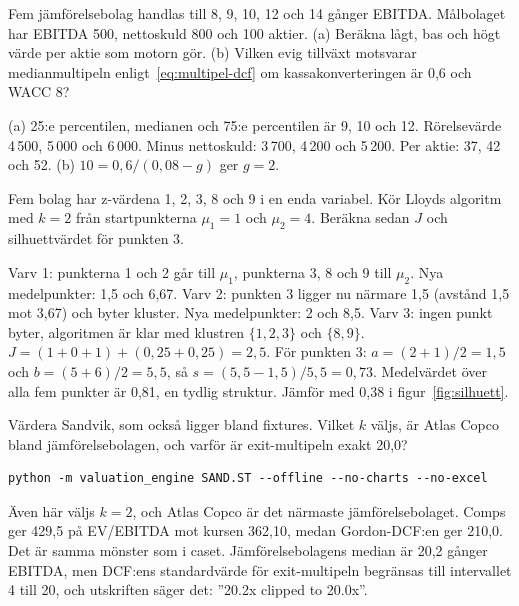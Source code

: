 \begin{ovning}
Fem jämförelsebolag handlas till 8, 9, 10, 12 och 14 gånger EBITDA. Målbolaget har EBITDA 500,
nettoskuld 800 och 100 aktier. (a) Beräkna lågt, bas och högt värde per aktie som motorn gör.
(b) Vilken evig tillväxt motsvarar medianmultipeln enligt~\eqref{eq:multipel-dcf} om
kassakonverteringen är 0,6 och WACC 8\pct?
\end{ovning}
\begin{losning}
(a) 25:e percentilen, medianen och 75:e percentilen är 9, 10 och 12. Rörelsevärde 4\,500,
5\,000 och 6\,000. Minus nettoskuld: 3\,700, 4\,200 och 5\,200. Per aktie: 37, 42 och 52\kr.
(b) $10 = 0,6 / (0,08 - g)$ ger $g = 2$\pct.
\end{losning}

\begin{ovning}
Fem bolag har z-värdena 1, 2, 3, 8 och 9 i en enda variabel. Kör Lloyds algoritm med $k = 2$
från startpunkterna $\mu_1 = 1$ och $\mu_2 = 4$. Beräkna sedan $J$ och silhuettvärdet för
punkten 3.
\end{ovning}
\begin{losning}
Varv 1: punkterna 1 och 2 går till $\mu_1$, punkterna 3, 8 och 9 till $\mu_2$. Nya
medelpunkter: 1,5 och 6,67. Varv 2: punkten 3 ligger nu närmare 1,5 (avstånd 1,5 mot 3,67) och
byter kluster. Nya medelpunkter: 2 och 8,5. Varv 3: ingen punkt byter, algoritmen är klar med
klustren $\{1, 2, 3\}$ och $\{8, 9\}$. $J = (1 + 0 + 1) + (0,25 + 0,25) = 2,5$. För punkten 3:
$a = (2 + 1)/2 = 1,5$ och $b = (5 + 6)/2 = 5,5$, så $s = (5,5 - 1,5)/5,5 = 0,73$.
Medelvärdet över alla fem punkter är 0,81, en tydlig struktur. Jämför med 0,38 i
figur~\ref{fig:silhuett}.
\end{losning}

\begin{ovning}
Värdera Sandvik, som också ligger bland fixtures. Vilket $k$ väljs, är Atlas Copco bland
jämförelsebolagen, och varför är exit-multipeln exakt 20,0?
\begin{lstlisting}[style=sh]
python -m valuation_engine SAND.ST --offline --no-charts --no-excel
\end{lstlisting}
\end{ovning}
\begin{losning}
Även här väljs $k = 2$, och Atlas Copco är det närmaste jämförelsebolaget. Comps ger
429,5\kr{} på EV/EBITDA mot kursen 362,10, medan Gordon-DCF:en ger 210,0. Det är samma mönster
som i caset. Jämförelsebolagens median är 20,2 gånger EBITDA, men DCF:ens standardvärde för
exit-multipeln begränsas till intervallet 4 till 20, och utskriften säger det: ”20.2x clipped
to 20.0x”.
\end{losning}

